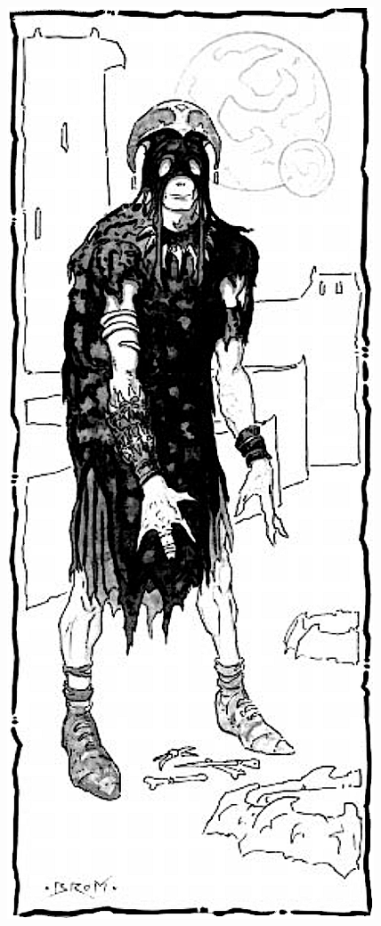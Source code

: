 \begin{figure}[b!]
\centering
\includegraphics[width=\columnwidth]{images/wiz-1.png}
\WOTC
\end{figure}